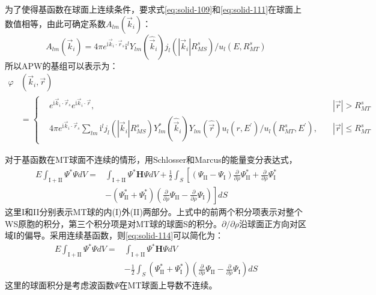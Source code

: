 为了使得基函数在球面上连续条件，要求式\eqref{eq:solid-109}和\eqref{eq:solid-111}在球面上数值相等，由此可确定系数$A_{lm}(\vec k_i)$：
$$A_{lm}(\vec k_i)=4\pi e^{\mathrm{i}\vec k_i\cdot\vec r_s}\mathrm{i}^lY_{lm}(\hat{\vec k}_i)j_l(|\vec k_i|R_{MS}^s)/u_l(E,R_{MT}^s)$$
所以APW的基组可以表示为：
\begin{equation}
  \begin{split}
    \varphi&(\vec k_i,\vec r)\\
    &=\left\{\begin{aligned}
	    &e^{\mathrm{i}\vec k_i\cdot\vec r_s}e^{\mathrm{i}\vec k_i\cdot\vec r},&|\vec r|>R_{MT}^s\\
    &4\pi e^{\mathrm{i}\vec k_i\cdot\vec r_s}\sum_{lm}\mathrm{i}^lj_l(|\vec k_i|R_{MS}^s)Y_{lm}^{\ast}(\hat{\vec k}_i)Y_{lm}(\hat{\vec r})u_l(r,E^{\prime})/u_l(R_{MT}^s,E^{\prime}),\quad&|\vec r|\leqslant R_{MT}^s
    \end{aligned} \right.
  \end{split}
  \label{eq:solid-113}
\end{equation}

对于基函数在MT球面不连续的情形，用Schlosser和Marcus的能量变分表达式\cite{PR131-2529_1963}，
\begin{equation}
  \begin{split}
    E\int_{\mathrm{I+II}}\Psi^{\ast}\Psi dV=&\int_{\mathrm{I+II}}\Psi^{\ast}\mathbf H\Psi dV+\frac12\int_S\left[(\Psi_{\mathrm{II}}-\Psi_{\mathrm I})\frac{\partial}{\partial\rho}\Psi_{\mathrm {II}}^{\ast}+\frac{\partial}{\partial\rho}\Psi_{\mathrm I}^{\ast}\right.\\
    &-(\Psi_{\mathrm {II}}^{\ast}+\Psi_{\mathrm I}^{\ast})\left.\left(\frac{\partial}{\partial\rho}\Psi_{\mathrm{II}}-\frac{\partial}{\partial\rho}\Psi_{\mathrm I}\right)\right]dS
  \end{split}
  \label{eq:solid-114}
\end{equation}
这里I和II分别表示MT球的内(I)外(II)两部分。上式中的前两个积分项表示对整个WS原胞的积分，第三个积分项是对MT球的球面S的积分。$\partial/\partial\rho$沿球面正方向对区域I的偏导。采用连续基函数，则\eqref{eq:solid-114}可以简化为：
\begin{equation}
  \begin{split}
    E\int_{\mathrm{I+II}}\Psi^{\ast}\Psi dV=&\int_{\mathrm{I+II}}\Psi^{\ast}\mathbf H\Psi dV\\
    &-\frac12\int_S(\Psi_{\mathrm {II}}^{\ast}+\Psi_{\mathrm I}^{\ast})\left(\frac{\partial}{\partial\rho}\Psi_{\mathrm{II}}-\frac{\partial}{\partial\rho}\Psi_{\mathrm I}\right)dS
  \end{split}
  \label{eq:solid-115}
\end{equation}
这里的球面积分是考虑波函数$\Psi$在MT球面上导数不连续。

